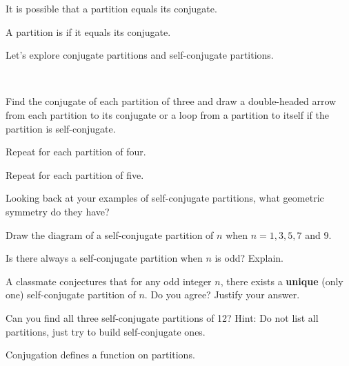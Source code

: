 It is possible that a partition equals its conjugate.

\begin{defn}
\label{defn_self_conj_partitions}
    A partition is  if it equals its conjugate.
\end{defn}

Let's explore conjugate partitions and self-conjugate partitions.

\begin{act}
\label{oact_selfconjugate_partitions}     
~
    \begin{actpart}
       \item \label{part_scpartitions3} Find the conjugate of each partition of three and draw a double-headed arrow from each partition to its conjugate or a loop from a partition to itself if the partition is self-conjugate.
       \item \label{part_scpartitions4} Repeat for each partition of four.
       \item \label{part_scpartitions5} Repeat for each partition of five.
       \item Looking back at your examples of self-conjugate partitions, what geometric symmetry do they have?
       \item Draw the diagram of a self-conjugate partition of $n$ when $n=1, 3, 5, 7$ and $9$.       
       \item \label{part_odd_self-conj} Is there always a self-conjugate partition when $n$ is odd?  Explain.
       \item   A classmate conjectures that for any odd integer $n$, there exists a \textbf{unique} (only one) self-conjugate partition of $n$.  Do you agree?  Justify your answer. 
       \item Can you find all three self-conjugate partitions of 12?  Hint: Do not list all partitions, just try to build self-conjugate ones.  %
    \end{actpart}
\end{act}

Conjugation defines a function on partitions.

